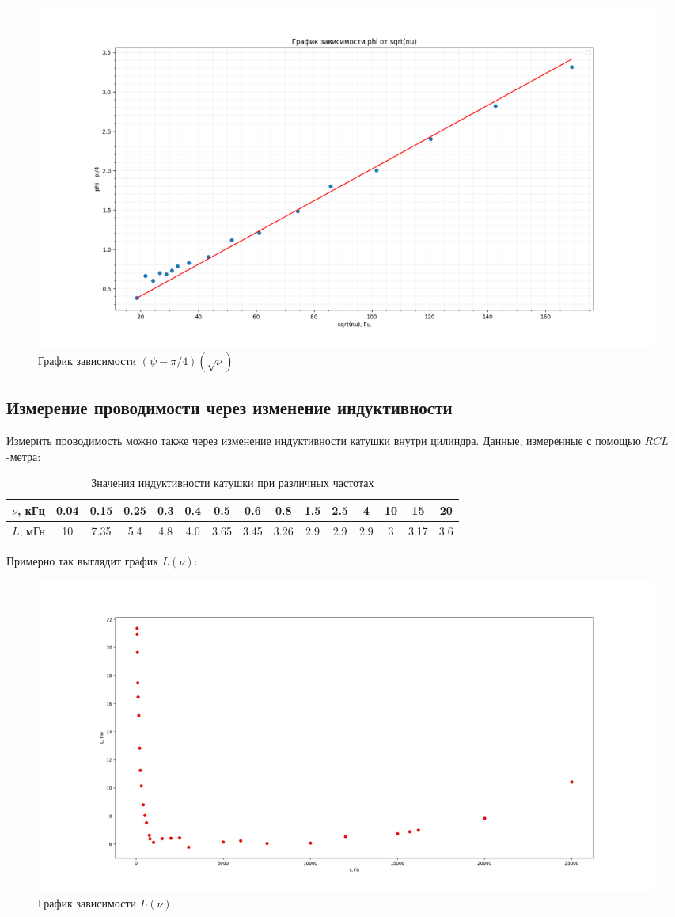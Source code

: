 \documentclass[a4paper, 12pt]{article}
\begin{document}
	\begin{figure}[h]
		\centering
		\includegraphics[width=\textwidth]{Figure_2.png}
		\caption{График зависимости $(\psi - \pi/4)(\sqrt{\nu})$}
		\newpage
	\end{figure}
	
	\subsection*{Измерение проводимости через изменение индуктивности}
	Измерить проводимость можно также через изменение индуктивности катушки внутри цилиндра. Данные, измеренные с помощью $RCL$-метра:
	
	\begin{table}[h!]
		\centering
		\begin{tabular}{|c|c|c|c|c|c|c|c|c|c|c|c|c|c|c|}
			\hline
			$\nu$, кГц & 0.04 & 0.15 & 0.25 & 0.3 & 0.4 & 0.5 & 0.6 & 0.8 & 1.5 & 2.5 & 4 & 10 & 15 & 20 \\
			\hline
			$L$, мГн & 10 & 7.35 & 5.4 & 4.8 & 4.0  & 3.65 & 3.45 & 3.26 & 2.9 & 2.9 & 2.9 & 3 & 3.17 & 3.6 \\
			\hline
		\end{tabular}
		\caption{Значения индуктивности катушки при различных частотах}
	\end{table}
	
	Примерно так выглядит график $L(\nu)$:
	
	\begin{figure}[H]
		\centering
		\includegraphics[width = \textwidth]{OC6qpjB486w.jpg}
		\caption{График зависимости $L(\nu)$}
	\end{figure}
	
\end{document}
